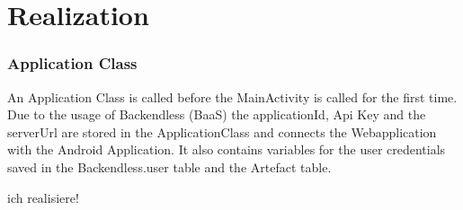 \newpage
\chapter{Realization}\label{cap:Realization}
\subsection{Application Class}
An Application Class is called before the MainActivity is called for the first time. Due to the usage of Backendless (BaaS) the applicationId, Api Key and the serverUrl are stored in the ApplicationClass and connects the Webapplication with the Android Application. It also contains variables for the user credentials saved in the Backendless.user table and the Artefact table. 

ich realisiere!